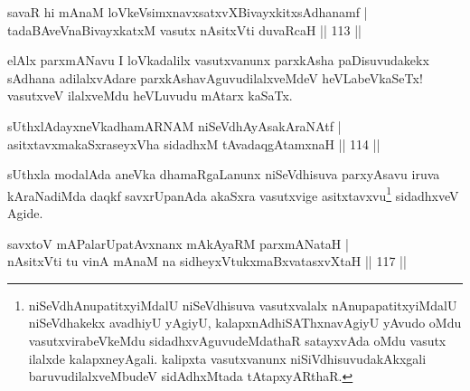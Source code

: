 \begin{shl}
savaR hi mAnaM loVkeV\s simxnavxsatxvXBivayxkitxsAdhanamf |\\
tadaBAveV\s naBivayxkatxM vasutx nAsitxVti duvaRcaH \hfill || 113 ||
\end{shl}

\begin{artha}
elAlx parxmANavu I loVkadalilx vasutxvanunx parxkAsha paDisuvudakekx sAdhana adilalxvAdare parxkAshavAguvudilalxveMdeV heVLabeVkaSeTx! vasutxveV ilalxveMdu heVLuvudu mAtarx kaSaTx.
\end{artha}


\begin{shl}
sUthxlAdayxneVkadhamARNAM niSeVdhAyAsakAraNAtf |\\
asitxtavxmakaSxraseyxVha sidadhxM tAvadaqgAtamxnaH \hfill || 114 ||
\end{shl}

\begin{artha}
sUthxla modalAda aneVka dhamaRgaLanunx niSeVdhisuva parxyAsavu iruva kAraNadiMda daqkf savxrUpanAda akaSxra vasutxvige asitxtavxvu\footnote{niSeVdhAnupatitxyiMdalU niSeVdhisuva vasutxvalalx nAnupapatitxyiMdalU niSeVdhakekx avadhiyU yAgiyU, kalapxnAdhiSAThxnavAgiyU yAvudo oMdu vasutxvirabeVkeMdu sidadhxvAguvudeMdathaR satayxvAda oMdu vasutx ilalxde kalapxneyAgali. kalipxta vasutxvanunx niSiVdhisuvudakAkxgali baruvudilalxveMbudeV sidAdhxMtada tAtapxyARthaR.} sidadhxveV Agide.
\end{artha}



\begin{shl}
savxtoV mAPalarUpatAvxnanx mAkAyaRM parxmANataH |\\
nAsitxVti tu vinA mAnaM na sidheyxVtukxmaBxvatasxvXtaH \hfill || 117 ||
\end{shl}


